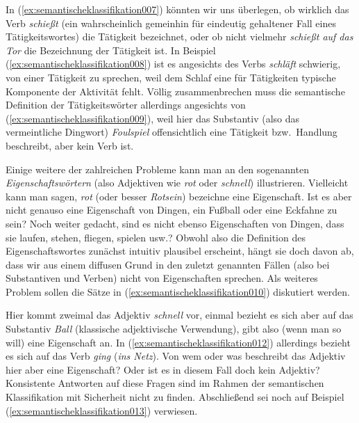 In (\ref{ex:semantischeklassifikation007}) könnten wir uns überlegen, ob wirklich das Verb \textit{schießt} (ein wahrscheinlich gemeinhin für eindeutig gehaltener Fall eines Tätigkeitswortes) die Tätigkeit bezeichnet, oder ob nicht vielmehr \textit{schießt auf das Tor} die Bezeichnung der Tätigkeit ist.
In Beispiel (\ref{ex:semantischeklassifikation008}) ist es angesichts des Verbs \textit{schläft} schwierig, von einer Tätigkeit zu sprechen, weil dem Schlaf eine für Tätigkeiten typische Komponente der Aktivität fehlt.
Völlig zusammenbrechen muss die semantische Definition der Tätigkeitswörter allerdings angesichts von (\ref{ex:semantischeklassifikation009}), weil hier das Substantiv (also das vermeintliche Dingwort) \textit{Foulspiel} offensichtlich eine Tätigkeit bzw.\ Handlung beschreibt, aber kein Verb ist.

Einige weitere der zahlreichen Probleme kann man an den sogenannten \textit{Eigenschaftswörtern} (also Adjektiven wie \textit{rot} oder \textit{schnell}) illustrieren.
Vielleicht kann man sagen, \textit{rot} (oder besser \textit{Rotsein}) bezeichne eine Eigenschaft.
Ist es aber nicht genauso eine Eigenschaft von Dingen, ein Fußball oder eine Eckfahne zu sein?
Noch weiter gedacht, sind es nicht ebenso Eigenschaften von Dingen, dass sie laufen, stehen, fliegen, spielen usw.?
Obwohl also die Definition des Eigenschaftswortes zunächst intuitiv plausibel erscheint, hängt sie doch davon ab, dass wir aus einem diffusen Grund in den zuletzt genannten Fällen (also bei Substantiven und Verben) nicht von Eigenschaften sprechen.
Als weiteres Problem sollen die Sätze in (\ref{ex:semantischeklassifikation010}) diskutiert werden.

\begin{exe}
  \ex \label{ex:semantischeklassifikation010}
  \begin{xlist}
  \end{xlist}
\end{exe}


Hier kommt zweimal das Adjektiv \textit{schnell} vor, einmal bezieht es sich aber auf das Substantiv \textit{Ball} (klassische adjektivische Verwendung), gibt also (wenn man so will) eine Eigenschaft an.
In (\ref{ex:semantischeklassifikation012}) allerdings bezieht es sich auf das Verb \textit{ging} (\textit{ins Netz}).
Von wem oder was beschreibt das Adjektiv hier aber eine Eigenschaft?
Oder ist es in diesem Fall doch kein Adjektiv?
Konsistente Antworten auf diese Fragen sind im Rahmen der semantischen Klassifikation mit Sicherheit nicht zu finden.
Abschließend sei noch auf Beispiel (\ref{ex:semantischeklassifikation013}) verwiesen.

